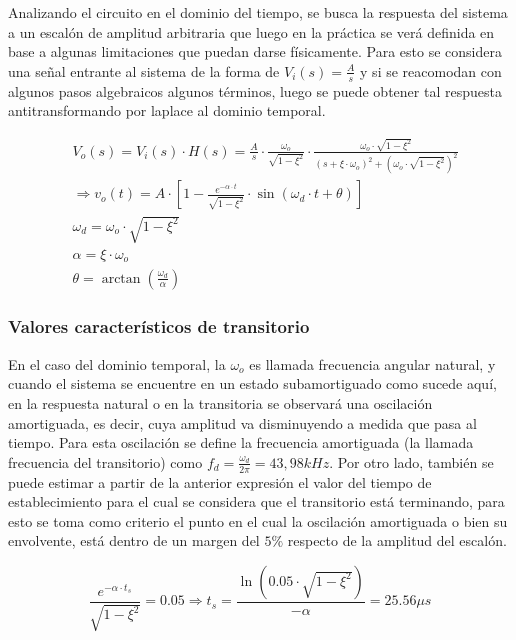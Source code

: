 Analizando el circuito en el dominio del tiempo, se busca la respuesta del sistema a un escal\'on de amplitud arbitraria que luego en la pr\'actica se ver\'a definida en base a 
algunas limitaciones que puedan darse f\'isicamente. Para esto se considera una se\~nal entrante al sistema de la forma de $V_i(s) = \frac{A}{s}$ y si se reacomodan con algunos pasos 
algebraicos algunos t\'erminos, luego se puede obtener tal respuesta antitransformando por laplace al dominio temporal.

\begin{align*}
    & V_o(s) = V_i(s) \cdot H(s) = \frac{A}{s} \cdot \frac{\omega_o}{\sqrt{1 - \xi^{2}}} \cdot \frac{\omega_o \cdot \sqrt{1 - \xi^{2}}}{(s + \xi \cdot \omega_o)^{2} + (\omega_o \cdot \sqrt{1 - \xi^{2}})^{2}} \\
    & \Rightarrow
    v_o(t) = A \cdot \left[ 1 - \frac{e^{-\alpha \cdot t}}{\sqrt{1 - \xi^{2}}} \cdot \sin{(\omega_d \cdot t + \theta)}\right] \\
    & \omega_d = \omega_o \cdot \sqrt{1 - \xi^{2}} \\
    & \alpha = \xi \cdot \omega_o \\
    & \theta = \arctan{(\frac{\omega_d}{\alpha})}
\end{align*}

\subsubsection{Valores caracter\'isticos de transitorio}
En el caso del dominio temporal, la $\omega_o$ es llamada frecuencia angular natural, y cuando el sistema se encuentre en un estado subamortiguado como sucede aqu\'i, en la respuesta natural o en la transitoria se 
observar\'a una oscilaci\'on amortiguada, es decir, cuya amplitud va disminuyendo a medida que pasa al tiempo. Para esta oscilaci\'on se define la frecuencia amortiguada (la llamada frecuencia del transitorio) como $f_d = \frac{\omega_d}{2 \pi} = 43,98kHz$.
Por otro lado, tambi\'en se puede estimar a partir de la anterior expresi\'on el valor del tiempo de establecimiento para el cual se considera que el transitorio est\'a terminando, para esto se toma como criterio el punto en el cual
la oscilaci\'on amortiguada o bien su envolvente, est\'a dentro de un margen del $5 \%$ respecto de la amplitud del escal\'on.

\begin{equation}
    \frac{e^{- \alpha \cdot t_s}}{\sqrt{1 - \xi^{2}}} = 0.05 
    \Rightarrow
    t_s = \frac{\ln{(0.05 \cdot \sqrt{1 - \xi^{2}})}}{- \alpha} = 25.56 \mu s
\end{equation}

